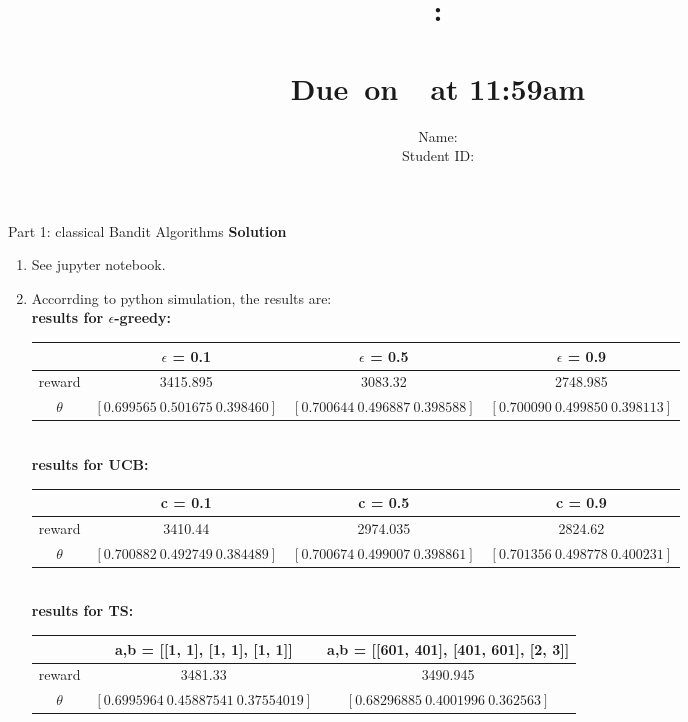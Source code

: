 \documentclass{article}
\title{
    \vspace{2in}
    \textmd{\textbf{\hmwkClass:\\  \hmwkTitle}}\\
    \normalsize\vspace{0.1in}\small{Due\ on\ \hmwkDueDate\ at 11:59am}\\
   \vspace{2in}
}
\author{
	Name: \textbf{\hmwkAuthorName} \\
	Student ID: \hmwkAuthorID}
\date{}
\newcommand{\solution}{\textbf{\Large Solution}}
\begin{document}
\maketitle
\pagebreak

\begin{homeworkProblem}{Part 1: classical Bandit Algorithms}
    \solution
    \begin{enumerate}
        \item[1,2.]
        See jupyter notebook.
        \item[3.]
        Accorrding to python simulation, the results are:\\
        \textbf{results for $\epsilon$-greedy:}\\
        \begin{tabular}[t]{|c|c|c|c|}
        \hline
         & $\epsilon$ = 0.1 & $\epsilon$ = 0.5 & $\epsilon$ = 0.9 \\
        \hline
        reward & 3415.895 & 3083.32 & 2748.985 \\
        \hline
        $\theta$ & $[0.699565\ 0.501675\ 0.398460]$ & $[0.700644\ 0.496887\ 0.398588]$ & $[0.700090\ 0.499850\ 0.398113]$ \\
        \hline
        \end{tabular}\\

        \textbf{results for UCB:}\\
        \begin{tabular}[t]{|c|c|c|c|}
        \hline
         & c = 0.1 & c = 0.5 & c = 0.9 \\
        \hline
        reward & 3410.44 & 2974.035 & 2824.62 \\
        \hline
        $\theta$ & $[0.700882\ 0.492749\ 0.384489]$ & $[0.700674\ 0.499007\ 0.398861]$ & $[0.701356\ 0.498778\ 0.400231]$ \\
        \hline
        \end{tabular}\\

        \textbf{results for TS:}\\
        \begin{tabular}[t]{|c|c|c|}
        \hline
         & a,b = [[1, 1], [1, 1], [1, 1]] & a,b = [[601, 401], [401, 601], [2, 3]]\\
        \hline
        reward & 3481.33 & 3490.945 \\
        \hline
        $\theta$ & $[0.6995964\ 0.45887541\ 0.37554019]$ & $[0.68296885\ 0.4001996\ 0.362563]$ \\
        \hline
        \end{tabular}\\


\end{enumerate}
\end{homeworkProblem}
\end{document}
